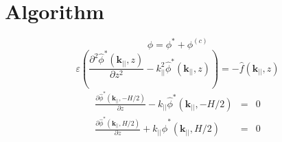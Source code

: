 \documentclass[ twoside,openright,titlepage,numbers=noenddot,%
headinclude,footinclude,cleardoublepage=empty,abstract=on,
BCOR=5mm,paper=a4,fontsize=11pt, dvipsnames
]{scrreprt}
\begin{document}
\section{Algorithm}
\begin{equation}  \phi = \phi^* + \phi^{(c)}\end{equation}  
\begin{equation}
  \varepsilon  \left( \frac{\partial ^2 \hat{\phi}^*(\mathbf{k}_{||},z)}{\partial z^2} -k_{||}^2 \hat{\phi}^*(\mathbf{k}_{||},z)  \right) = -\hat{f}(\mathbf{k}_{||},z)
\end{equation}
\begin{eqnarray}
  \frac{\partial \hat{\phi}^*(\mathbf{k}_{||},-H/2)}{\partial z} -  k_{||} \hat{\phi}^*(\mathbf{k}_{||},-H/2)&=&0 \\
  \frac{\partial \hat{\phi}^*(\mathbf{k}_{||},H/2)}{\partial z}  +  k_{||} \hat{\phi}^*(\mathbf{k}_{||},H/2) &=&0
\label{eq:dppoisson_ewald}
\end{eqnarray}
\end{document}
